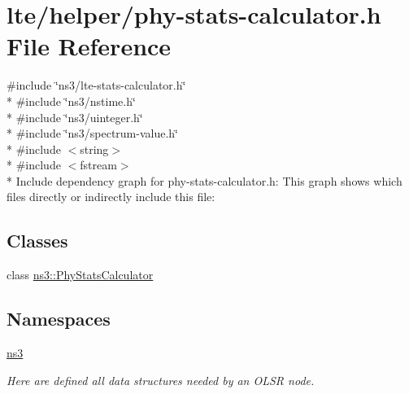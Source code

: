\hypertarget{phy-stats-calculator_8h}{}\section{lte/helper/phy-\/stats-\/calculator.h File Reference}
\label{phy-stats-calculator_8h}
{\ttfamily \#include \char`\"{}ns3/lte-\/stats-\/calculator.\+h\char`\"{}}\\*
{\ttfamily \#include \char`\"{}ns3/nstime.\+h\char`\"{}}\\*
{\ttfamily \#include \char`\"{}ns3/uinteger.\+h\char`\"{}}\\*
{\ttfamily \#include \char`\"{}ns3/spectrum-\/value.\+h\char`\"{}}\\*
{\ttfamily \#include $<$string$>$}\\*
{\ttfamily \#include $<$fstream$>$}\\*
Include dependency graph for phy-\/stats-\/calculator.h\+:
This graph shows which files directly or indirectly include this file\+:
\subsection*{Classes}
\begin{DoxyCompactItemize}
\item 
class \hyperlink{classns3_1_1PhyStatsCalculator}{ns3\+::\+Phy\+Stats\+Calculator}
\end{DoxyCompactItemize}
\subsection*{Namespaces}
\begin{DoxyCompactItemize}
\item 
 \hyperlink{namespacens3}{ns3}
\begin{DoxyCompactList}\small\item\em Here are defined all data structures needed by an O\+L\+SR node. \end{DoxyCompactList}\end{DoxyCompactItemize}
